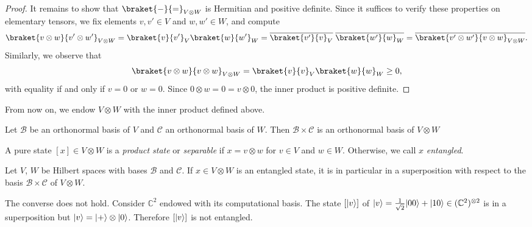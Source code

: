 \documentclass[a4paper, oneside, 12pt]{amsart}
\begin{document}
\begin{proof}
  It remains to show that \( \braket{\blank}{\bblank}_{V \otimes W} \) is Hermitian and positive definite.
  Since it suffices to verify these properties on elementary tensors, we fix elements  \(v, v' \in V\) and \(w,w' \in W\), and compute
  \begin{equation*}
  \braket{v \otimes w}{v' \otimes w'}_{V \otimes W} = \braket{v}{v'}_V \braket{w}{w'}_W = \overline{\braket{v'}{v}_V} \; \overline{\braket{w'}{w}_W} = \overline{\braket{v' \otimes w'}{v \otimes w}_{V \otimes W}}.
  \end{equation*}
  Similarly, we observe that
  \begin{equation*}
      \braket{v \otimes w}{v \otimes w}_{V \otimes W} = \braket{v}{v}_V \braket{w}{w}_W \geq 0,
  \end{equation*}
  with equality if and only if \( v = 0 \) or \( w = 0 \).
  Since \( 0 \otimes w = 0 = v \otimes 0 \), the inner product is positive definite.
\end{proof}

From now on, we endow \( V \otimes W \) with the inner product defined above.

\begin{corollary}\label{cor:onbs-tensor-to-onbs}
  Let \(\mathcal{B}\) be an orthonormal basis of \(V\) and \(\mathcal{C}\) an orthonormal basis of \(W\).
  Then \(\mathcal{B}\times \mathcal{C}\) is an orthonormal basis of \(V\otimes W\)
\end{corollary}


\begin{definition}\label{def:entangled-state}
  A pure state \( [x] \in V \otimes W \) is a \emph{product state} or \emph{separable} if \(x = v\otimes w\) for \(v\in V\) and \(w \in W\).
  Otherwise, we call \(x\) \emph{entangled}.
\end{definition}

\begin{remark}\label{rmk:comparison-superposition-vs-entanglement}
  Let \(V\), \(W\) be Hilbert spaces with bases \(\mathcal{B}\) and \(\mathcal{C}\).
  If  \(x\in V\otimes W \) is an entangled state, it is in particular in a superposition with respect to the basis \(\mathcal{B}\times \mathcal{C}\) of \(V\otimes W\).

  The converse does not hold.
  Consider \( \mathbb{C}^{2}\) endowed with its computational basis.
  The state \([\lvert v\rangle]\) of \(\lvert v\rangle=\tfrac{1}{\sqrt{2}} \lvert00\rangle + \lvert10\rangle \in (\mathbb{C}^{2})^{\otimes 2}\) is in a superposition but \(\lvert v\rangle = \lvert+\rangle \otimes \lvert0\rangle\). Therefore \([\lvert v\rangle]\) is not entangled.
\end{remark}
\end{document}
